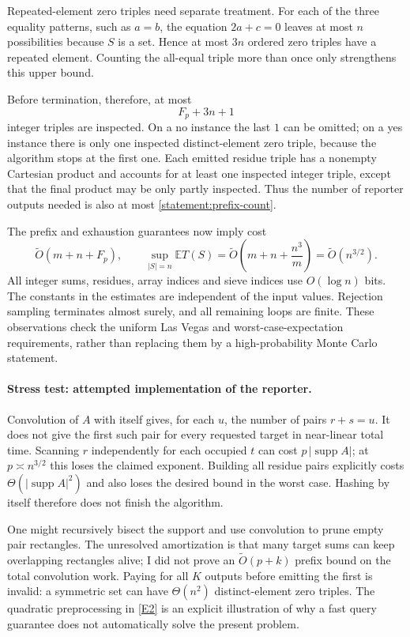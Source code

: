 \documentclass[11pt,a4paper]{article}
\newcommand{\E}{\mathbb{E}}
\newcommand{\eref}[2]{\hyperlink{extra:#1:#2}{[E#2]}}
\numberwithin{equation}{section}
\begin{document}
Repeated-element zero triples need separate treatment. For each of the
three equality patterns, such as $a=b$, the equation $2a+c=0$ leaves at
most $n$ possibilities because $S$ is a set. Hence at most $3n$ ordered
zero triples have a repeated element. Counting the all-equal triple more
than once only strengthens this upper bound.

Before termination, therefore, at most
\begin{equation}\label{statement:prefix-count}
 F_p+3n+1
\end{equation}
integer triples are inspected. On a no instance the last $1$ can be
omitted; on a yes instance there is only one inspected distinct-element
zero triple, because the algorithm stops at the first one. Each emitted
residue triple has a nonempty Cartesian product and accounts for at
least one inspected integer triple, except that the final product may
be only partly inspected. Thus the number of reporter outputs needed is
also at most \eqref{statement:prefix-count}.

The prefix and exhaustion guarantees now imply cost
\[
 \widetilde O(m+n+F_p),\qquad
 \sup_{|S|=n}\E T(S)
 =\widetilde O\left(m+n+\frac{n^3}{m}\right)
 =\widetilde O(n^{3/2}).
\]
All integer sums, residues, array indices and sieve indices use
$O(\log n)$ bits. The constants in the estimates are independent of the
input values. Rejection sampling terminates almost surely, and all
remaining loops are finite. These observations check the uniform
Las Vegas and worst-case-expectation requirements, rather than replacing
them by a high-probability Monte Carlo statement.

\paragraph{Stress test: attempted implementation of the reporter.}
Convolution of $A$ with itself gives, for each $u$, the number of pairs
$r+s=u$. It does not give the first such pair for every requested target
in near-linear total time. Scanning $r$ independently for each occupied
$t$ can cost $p\,|\operatorname{supp}A|$; at
$p\asymp n^{3/2}$ this loses the claimed exponent. Building all residue
pairs explicitly costs $\Theta(|\operatorname{supp}A|^2)$ and also loses
the desired bound in the worst case. Hashing by itself therefore does
not finish the algorithm.

One might recursively bisect the support and use convolution to prune
empty pair rectangles. The unresolved amortization is that many target
sums can keep overlapping rectangles alive; I did not prove an
$\widetilde O(p+k)$ prefix bound on the total convolution work. Paying
for all $K$ outputs before emitting the first is invalid: a symmetric
set can have $\Theta(n^2)$ distinct-element zero triples. The quadratic
preprocessing in \eref{statement}{2} is an explicit illustration of why a fast
query guarantee does not automatically solve the present problem.
\end{document}
